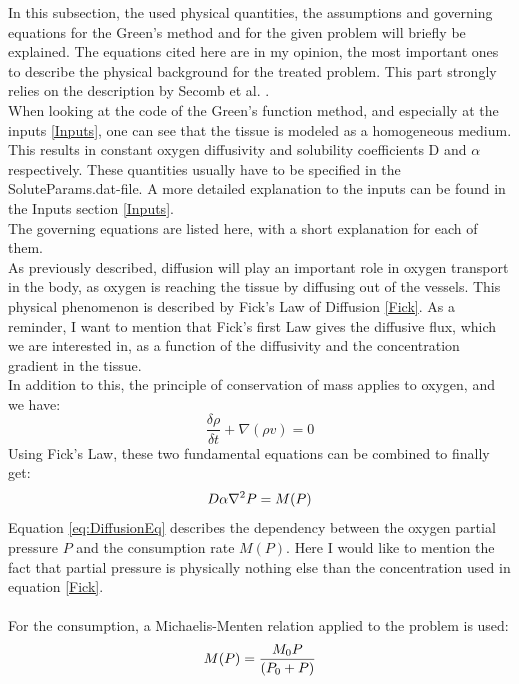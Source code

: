 In this subsection, the used physical quantities, the assumptions and governing equations for the Green's method and for the given problem will briefly be explained. The equations cited here are in my opinion, the most important ones to describe the physical background for the treated problem. This part strongly relies on the description by Secomb et al. \cite{Secomb2004}.
\\When looking at the code of the Green's function method, and especially at the inputs \ref{Inputs}, one can see that the tissue is modeled as a homogeneous medium. This results in constant oxygen diffusivity and solubility coefficients D and $\alpha$ respectively. These quantities usually have to be specified in the SoluteParams.dat-file. A more detailed explanation to the inputs can be found in the Inputs section \ref{Inputs}.
\\The governing equations are listed here, with a short explanation for each of them.
\\As previously described, diffusion will play an important role in oxygen transport in the body, as oxygen is reaching the tissue by diffusing out of the vessels. This physical phenomenon is described by Fick's Law of Diffusion \ref{Fick}.
%
As a reminder, I want to mention that Fick's first Law gives the diffusive flux, which we are interested in, as a function of the diffusivity and the concentration gradient in the tissue.
\\In addition to this, the principle of conservation of mass applies to oxygen, and we have:
\begin{equation}
\frac{\delta \rho} {\delta t} + \nabla (\rho v) = 0
\end{equation}
%
Using Fick's Law, these two fundamental equations can be combined to finally get:
\begin{equation}
\\D\alpha\nabla^2P = M(P)
\label{eq:DiffusionEq}
\end{equation}
%
Equation \ref{eq:DiffusionEq} describes the dependency between the oxygen partial pressure $P$ and the consumption rate $M(P)$. Here I would like to mention the fact that partial pressure is physically nothing else than the concentration used in equation \ref{Fick}.\\
\\For the consumption, a Michaelis-Menten relation applied to the problem is used:
\begin{equation}
\\M(P) = \frac{M_0P}{(P_0 + P)}
\label{eq:MichaelisMenten}
\end{equation}
